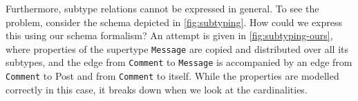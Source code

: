 \documentclass{article}
\newcommand{\otype}{\tau^\mathsf{o}}
\begin{document}





Furthermore, subtype relations cannot be expressed in general. To see the problem, consider the schema depicted in \autoref{fig:subtyping}. How could we express this using our schema formalism? An attempt is given in \autoref{fig:subtyping-ours}, where properties of the supertype \texttt{Message} are copied and distributed over all its subtypes, and the edge from \texttt{Comment} to \texttt{Message} is accompanied by an edge from \texttt{Comment} to Post and from \texttt{Comment} to itself. While the properties are modelled correctly in this case, it breaks down when we look at the cardinalities.
\end{document}
